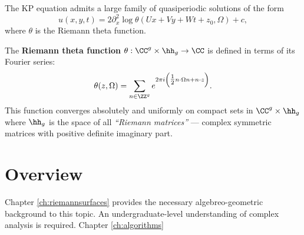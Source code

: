 
The KP equation admits a large family of quasiperiodic solutions of the form
\begin{equation} \label{eqn: kpsol}
  u(x,y,t) = 2 \partial_x^2 \log \theta(Ux+Vy+Wt+z_0, \Omega) + c,
\end{equation}
where $\theta$ is the Riemann theta function.

\begin{definition} \label{def: riemanntheta}
  The {\bf Riemann theta function} $\theta: \CC^g \times \hh_g \to \CC$
  is defined in terms of its Fourier series:
  \begin{equation} \label{eqn: riemanntheta}
    \theta(z,\Omega) = \sum_{n \in \ZZ^g}
    e^{2 \pi i \left( \tfrac{1}{2} n \cdot \Omega n + n \cdot z \right)}.
  \end{equation}
  This function converges absolutely and uniformly on compact sets in
  $\CC^g \times \hh_g$ where $\hh_g$ is the space of all {\it ``Riemann
    matrices''} --- complex symmetric matrices with positive definite
  imaginary part.
\end{definition}


\section{Overview}

Chapter \ref{ch:riemannsurfaces} provides the necessary algebreo-geometric
background to this topic. An undergraduate-level understanding of complex
analysis is required. Chapter \ref{ch:algorithms} 
